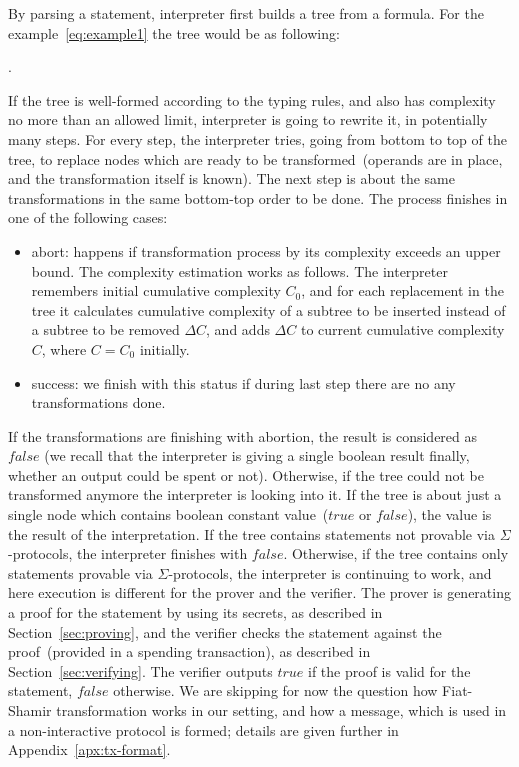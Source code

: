 \documentclass[11pt]{article}
\newcommand{\authnote}[2]{\marginpar{\parbox{\marginparwidth}{\tiny %
  \textsf{#1 {\textcolor{blue}{notes: #2}}}}}%
  \textcolor{blue}{\textbf{\dag}}}
\newcommand{\authnote}[2]{
  \textsf{#1 \textcolor{blue}{: #2}}}
\newcommand{\authnote}[2]{}
\newcommand{\knote}[1]{{\authnote{\textcolor{green}{kushti notes}}{#1}}}
\begin{document}
By parsing a statement, interpreter first builds a tree from a formula. For the example~\ref{eq:example1} the tree would be as following:

\knote{draw the tree}.

If the tree is well-formed according to the typing rules, and also has complexity no more than an allowed limit, interpreter is going to rewrite it, in potentially many steps. For every step, the interpreter tries, going from bottom to top of the tree, to replace nodes which are ready to be transformed~(operands are in place, and the transformation itself is known). The next step is about the same transformations in the same bottom-top order to be done. The process finishes in one of the following cases:

\begin{itemize}
    \item{abort: } happens if transformation process by its complexity exceeds an upper bound. The complexity estimation works as follows. The interpreter remembers initial cumulative complexity $C_0$, and for each replacement in the tree it calculates cumulative complexity of a subtree to be inserted instead of a subtree to be removed $\Delta C$, and adds $\Delta C$ to current cumulative complexity $C$, where $C = C_0$ initially.  
    \item{success: } we finish with this status if during last step there are no any transformations done.  
\end{itemize} 

If the transformations are finishing with abortion, the result is considered as $false$ (we recall that the interpreter is giving a single boolean result finally, whether an output could be spent or not). Otherwise, if the tree could not be transformed anymore the interpreter is looking into it. If the tree is about just a single node which contains boolean constant value~($true$ or $false$), the value is the result of the interpretation. If the tree contains statements not provable via $\Sigma$-protocols, the interpreter finishes with $false$. Otherwise, if the tree contains only statements provable via $\Sigma$-protocols, the interpreter is continuing to work, and here execution is different for the prover and the verifier. The prover is generating a proof for the statement by using its secrets, as described in Section~\ref{sec:proving}, and the verifier checks the statement against the proof~(provided in a spending transaction), as described in Section~\ref{sec:verifying}. The verifier outputs $true$ if the proof is valid for the statement, $false$ otherwise. We are skipping for now the question how Fiat-Shamir transformation works in our setting, and how a message, which is used in a non-interactive protocol is formed; details are given further in Appendix~\ref{apx:tx-format}. 
\end{document}
